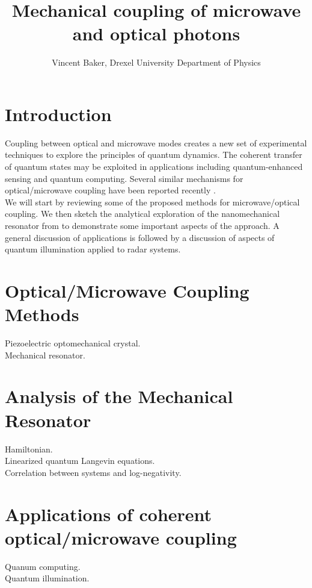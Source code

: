 \documentclass[a4paper,10pt,twocolumn]{article}
\title{Mechanical coupling of microwave and optical photons}
\author{Vincent Baker, Drexel University Department of Physics}
\numberwithin{equation}{section}
\begin{document}
\section{Introduction}
Coupling between optical and microwave modes creates a new set of experimental techniques to explore the principles of quantum dynamics.
The coherent transfer of quantum states may be exploited in applications including quantum-enhanced sensing and quantum computing.
Several similar mechanisms for optical/microwave coupling have been reported recently \cite{nanoCrystal, nanoMR}.\\
We will start by reviewing some of the proposed methods for microwave/optical coupling.
We then sketch the analytical exploration of the nanomechanical resonator from \cite{nanoMR} to demonstrate some important aspects of the approach. 
A general discussion of applications is followed by a discussion of aspects of quantum illumination applied to radar systems.

\section{Optical/Microwave Coupling Methods}
Piezoelectric optomechanical crystal.\\
Mechanical resonator.
\section{Analysis of the Mechanical Resonator}
Hamiltonian.\\
Linearized quantum Langevin equations.\\
Correlation between systems and log-negativity.             
\section{Applications of coherent optical/microwave coupling}
Quanum computing.\\
Quantum illumination.
\end{document}
